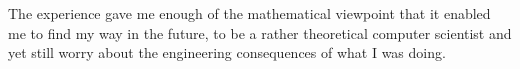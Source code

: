 The experience gave me enough of the mathematical viewpoint that it enabled me to find my way in the future, to be a rather theoretical computer scientist and yet still worry about the engineering consequences of what I was doing.